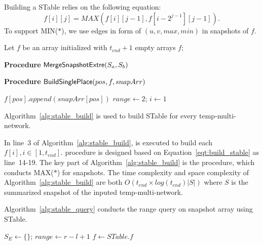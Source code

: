 \documentclass[10pt,journal,compsoc]{IEEEtran}
\begin{document}
{ Building a STable relies on the following equation:
\begin{equation}
	\label{eqt:build_stable}
	f[i][j]=MAX(f[i][j-1],f[i-2^{j-1}][j-1]).
\end{equation}
To support MIN($\ast$), we use edges in form of $ (u,v,max,min) $ in snapshots of $ f $.
\begin{algorithm}[t]
	\scriptsize
	\caption{$\kw{STable Build}$}
	\label{alg:stable_build}
	Let $ f $ be an array initialized with $ t_{end}+1 $ empty arrays\;
	\Return $ f $;

	\vspace*{0.2cm}
	{\bf Procedure} {${\mathsf{MergeSnapshotExtre}}(S_a,S_b)$}
	

	\vspace*{0.2cm}
	{\bf Procedure} {${\mathsf{BuildSinglePlace}}(pos,f,snapArr)$}
	
	$ f[pos].append(snapArr[pos]) $\;
	$ range \gets 2 $;
	$ i \gets 1 $\;
\end{algorithm}
Algorithm~\ref{alg:stable_build} is used to build STable for every temp-multi-network.

In line~3 of Algorithm~\ref{alg:stable_build},  is executed to build each $ f[i],i\in [1,t_{end}] $.  procedure is designed based on Equation~\ref{eqt:build_stable} as line~14-19. The key part of Algorithm~\ref{alg:stable_build} is the  procedure, which conducts MAX($\ast$) for snapshots. The time complexity and space complexity of Algorithm~\ref{alg:stable_build} are both $ O(t_{end}\times log(t_{end})|S|) $ where $ S $ is the summarized snapshot of the inputed temp-multi-network.

 Algorithm~\ref{alg:stable_query} conducts the range query on snapshot array using STable.
\begin{algorithm}[t]
	\scriptsize
	\caption{$\kw{STable Query}$}
	\label{alg:stable_query}
	$ S_E \gets \{\} $;
	$ range \gets r-l+1 $\;
	$ f \gets STable.f $\;


\end{algorithm}}
\end{document}
